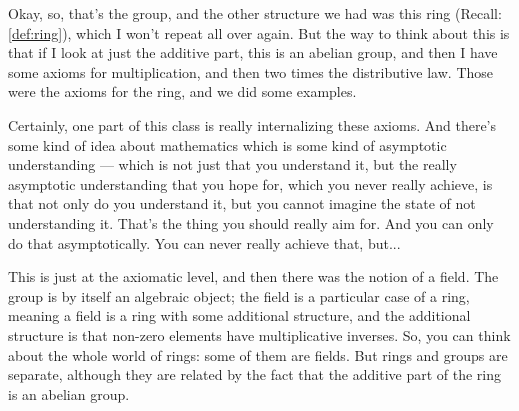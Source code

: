 \begin{speech}[00:05:05 - 00:06:54]
Okay, so, that's the group, and the other structure we had was this ring (Recall: \cref{def:ring}),  which I won't repeat all over again. But the way to think about this is that if I look at just the additive part, this is an abelian group,  and then I have some axioms for multiplication,  and then two times the distributive law.  Those were the axioms for the ring, and we did some examples.

Certainly, one part of this class is really internalizing these axioms. And there's some kind of idea about mathematics which is some kind of asymptotic understanding --- which is not just that you understand it, but the really asymptotic understanding that you hope for, which you never really achieve, is that not only do you understand it, but you cannot imagine the state of not understanding it. That's the thing you should really aim for. And you can only do that asymptotically. You can never really achieve that, but...

This is just at the axiomatic level, and then there was the notion of a field.  The group is by itself an algebraic object; the field is a particular case of a ring,  meaning a field is a ring with some additional structure, and the additional structure is that non-zero elements have multiplicative inverses. So, you can think about the whole world of rings: some of them are fields. But rings and groups are separate, although they are related by the fact that the additive part of the ring is an abelian group.
\end{speech}

